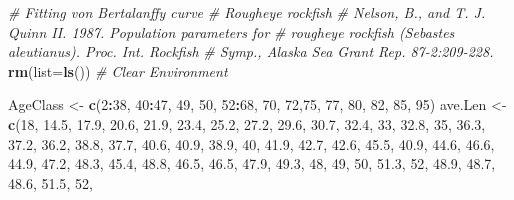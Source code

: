 \documentclass[
]{krantz}
\makeatletter
\newenvironment{Shaded}{\begin{snugshade}}{\end{snugshade}}
\newcommand{\AttributeTok}[1]{\textcolor[rgb]{0.27,0.27,0.27}{#1}}
\newcommand{\CommentTok}[1]{\textcolor[rgb]{0.37,0.37,0.37}{\textit{#1}}}
\newcommand{\DecValTok}[1]{\textcolor[rgb]{0.06,0.06,0.06}{#1}}
\newcommand{\FloatTok}[1]{\textcolor[rgb]{0.06,0.06,0.06}{#1}}
\newcommand{\FunctionTok}[1]{\textcolor[rgb]{0.27,0.27,0.27}{\textbf{#1}}}
\newcommand{\NormalTok}[1]{#1}
\newcommand{\OtherTok}[1]{\textcolor[rgb]{0.37,0.37,0.37}{#1}}
\newcommand{\SpecialCharTok}[1]{\textcolor[rgb]{0.43,0.43,0.43}{\textbf{#1}}}
\newenvironment{kframe}{%
\medskip{}
\setlength{\fboxsep}{.8em}
 \def\at@end@of@kframe{}%
 \ifinner\ifhmode%
  \def\at@end@of@kframe{\end{minipage}}%
  \begin{minipage}{\columnwidth}%
 \fi\fi%
 \def\FrameCommand##1{\hskip\@totalleftmargin \hskip-\fboxsep
 \colorbox{shadecolor}{##1}\hskip-\fboxsep
     \hskip-\linewidth \hskip-\@totalleftmargin \hskip\columnwidth}%
 \MakeFramed {\advance\hsize-\width
   \@totalleftmargin\z@ \linewidth\hsize
   \@setminipage}}%
 {\par\unskip\endMakeFramed%
 \at@end@of@kframe}
\renewenvironment{Shaded}{\begin{kframe}}{\end{kframe}}
\makeatother
\begin{document}
\begin{Shaded}
\begin{Highlighting}[]
\CommentTok{\# Fitting von Bertalanffy curve}
\CommentTok{\# Rougheye rockfish}
\CommentTok{\# Nelson, B., and T. J. Quinn II. 1987. Population parameters for}
\CommentTok{\# rougheye rockfish (Sebastes aleutianus). Proc. Int. Rockfish}
\CommentTok{\# Symp., Alaska Sea Grant Rep. 87{-}2:209{-}228.}
\FunctionTok{rm}\NormalTok{(}\AttributeTok{list=}\FunctionTok{ls}\NormalTok{()) }\CommentTok{\# Clear Environment}

\NormalTok{AgeClass }\OtherTok{\textless{}{-}} \FunctionTok{c}\NormalTok{(}\DecValTok{2}\SpecialCharTok{:}\DecValTok{38}\NormalTok{, }\DecValTok{40}\SpecialCharTok{:}\DecValTok{47}\NormalTok{, }\DecValTok{49}\NormalTok{, }\DecValTok{50}\NormalTok{, }\DecValTok{52}\SpecialCharTok{:}\DecValTok{68}\NormalTok{, }\DecValTok{70}\NormalTok{, }\DecValTok{72}\NormalTok{,}\DecValTok{75}\NormalTok{, }\DecValTok{77}\NormalTok{, }\DecValTok{80}\NormalTok{, }\DecValTok{82}\NormalTok{, }\DecValTok{85}\NormalTok{, }\DecValTok{95}\NormalTok{)}
\NormalTok{ave.Len }\OtherTok{\textless{}{-}} \FunctionTok{c}\NormalTok{(}\DecValTok{18}\NormalTok{, }\FloatTok{14.5}\NormalTok{, }\FloatTok{17.9}\NormalTok{, }\FloatTok{20.6}\NormalTok{, }\FloatTok{21.9}\NormalTok{, }\FloatTok{23.4}\NormalTok{, }\FloatTok{25.2}\NormalTok{, }\FloatTok{27.2}\NormalTok{, }\FloatTok{29.6}\NormalTok{, }\FloatTok{30.7}\NormalTok{,}
             \FloatTok{32.4}\NormalTok{, }\DecValTok{33}\NormalTok{, }\FloatTok{32.8}\NormalTok{, }\DecValTok{35}\NormalTok{, }\FloatTok{36.3}\NormalTok{, }\FloatTok{37.2}\NormalTok{, }\FloatTok{36.2}\NormalTok{, }\FloatTok{38.8}\NormalTok{, }\FloatTok{37.7}\NormalTok{, }\FloatTok{40.6}\NormalTok{,}
             \FloatTok{40.9}\NormalTok{, }\FloatTok{38.9}\NormalTok{, }\DecValTok{40}\NormalTok{, }\FloatTok{41.9}\NormalTok{, }\FloatTok{42.7}\NormalTok{, }\FloatTok{42.6}\NormalTok{, }\FloatTok{45.5}\NormalTok{, }\FloatTok{40.9}\NormalTok{, }\FloatTok{44.6}\NormalTok{,}
             \FloatTok{46.6}\NormalTok{, }\FloatTok{44.9}\NormalTok{, }\FloatTok{47.2}\NormalTok{, }\FloatTok{48.3}\NormalTok{, }\FloatTok{45.4}\NormalTok{, }\FloatTok{48.8}\NormalTok{, }\FloatTok{46.5}\NormalTok{, }\FloatTok{46.5}\NormalTok{, }\FloatTok{47.9}\NormalTok{,}
             \FloatTok{49.3}\NormalTok{, }\DecValTok{48}\NormalTok{, }\DecValTok{49}\NormalTok{, }\DecValTok{50}\NormalTok{, }\FloatTok{51.3}\NormalTok{, }\DecValTok{52}\NormalTok{, }\FloatTok{48.9}\NormalTok{, }\FloatTok{48.7}\NormalTok{, }\FloatTok{48.6}\NormalTok{, }\FloatTok{51.5}\NormalTok{, }\DecValTok{52}\NormalTok{,}

\end{Highlighting}
\end{Shaded}
\end{document}
